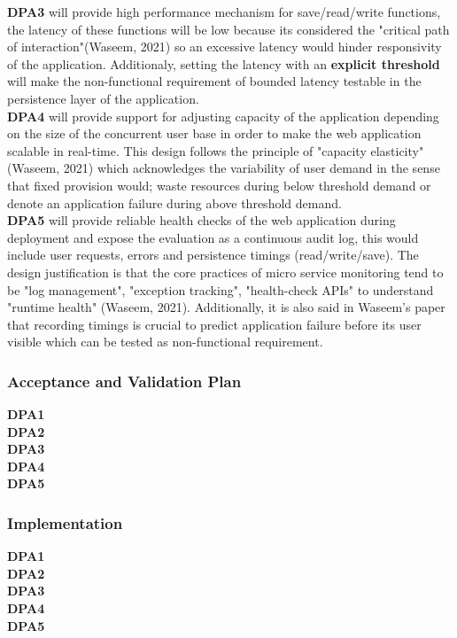 \documentclass{article}
\begin{document}
\textbf{DPA3} will provide high performance mechanism for save/read/write functions, the latency of these functions will be low because its considered the "critical path of interaction"(Waseem, 2021) so an excessive latency would hinder responsivity of the application. Additionaly, setting the latency with an \textbf{explicit threshold} will make the non-functional requirement of bounded latency testable in the persistence layer of the application.\\

\textbf{DPA4} will provide support for adjusting capacity of the application depending on the size of the concurrent user base in order to make the web application scalable in real-time. This design follows the principle of "capacity elasticity"(Waseem, 2021) which acknowledges the variability of user demand in the sense that fixed provision would; waste resources during below threshold demand or denote an application failure during above threshold demand. \\ 
\textbf{DPA5} will provide reliable health checks of the web application during deployment and expose the evaluation as a continuous audit log, this would include user requests, errors and persistence timings (read/write/save). The design justification is that the core practices of micro service monitoring tend to be "log management", "exception tracking", "health-check APIs" to understand "runtime health" (Waseem, 2021). Additionally, it is also said in Waseem's paper that recording timings is crucial to predict application failure before its user visible which can be tested as non-functional requirement.\\

\subsubsection{Acceptance and Validation Plan}
\textbf{DPA1} \mbox{} \\
\textbf{DPA2} \mbox{} \\
\textbf{DPA3} \mbox{} \\
\textbf{DPA4} \mbox{} \\
\textbf{DPA5} \mbox{} \\

\subsubsection{Implementation}
\textbf{DPA1} \mbox{} \\
\textbf{DPA2} \mbox{} \\
\textbf{DPA3} \mbox{} \\
\textbf{DPA4} \mbox{} \\
\textbf{DPA5} \mbox{} \\
\end{document}
